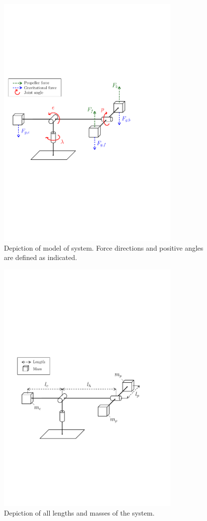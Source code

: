 \begin{figure}[bp]
	\centering
	\includegraphics[width=0.80\textwidth]{figures/forces.pdf}
	\caption{Depiction of model of system. Force directions and positive angles are defined as indicated.}
\label{fig:heli}
\end{figure}

\begin{figure}[bp]
	\centering
	\includegraphics[width=0.80\textwidth]{figures/helicopter.pdf}
	\caption{Depiction of all lengths and masses of the system.}
\label{fig:heli_dimensions}
\end{figure}

